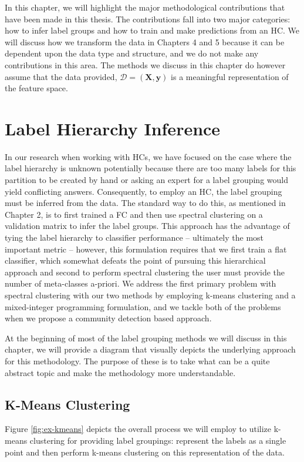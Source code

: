 \documentclass[../thesis.tex]{subfiles}
\begin{document}
In this chapter, we will highlight the major methodological contributions that have been made in this thesis. The contributions fall into two major categories: how to infer label groups and how to train and make predictions from an HC. We will discuss how we transform the data in Chapters 4 and 5 because it can be dependent upon the data type and structure, and we do not make any contributions in this area. The methods we discuss in this chapter do however assume that the data provided, $\mathcal{D} = (\mathbf{X}, \mathbf{y})$ is a meaningful representation of the feature space.

\section{Label Hierarchy Inference}
In our research when working with HCs, we have focused on the case where the label hierarchy is unknown potentially because there are too many labels for this partition to be created by hand or asking an expert for a label grouping would yield conflicting answers. Consequently, to employ an HC, the label grouping must be inferred from the data. The standard way to do this, as mentioned in Chapter 2, is to first trained a FC and then use spectral clustering on a validation matrix to infer the label groups. This approach has the advantage of tying the label hierarchy to classifier performance -- ultimately the most important metric -- however, this formulation requires that we first train a flat classifier, which somewhat defeats the point of pursuing this hierarchical approach and second to perform spectral clustering the user must provide the number of meta-classes a-priori. We address the first primary problem with spectral clustering with our two methods by employing k-means clustering and a mixed-integer programming formulation, and we tackle both of the problems when we propose a community detection based approach.

At the beginning of most of the label grouping methods we will discuss in this chapter, we will provide a diagram that visually depicts the underlying approach for this methodology. The purpose of these is to take what can be a quite abstract topic and make the methodology more understandable.

\subsection{K-Means Clustering}
Figure \ref{fig:ex-kmeans} depicts the overall process we will employ to utilize k-means clustering for providing label groupings: represent the labels as a single point and then perform k-means clustering on this representation of the data.
\end{document}
